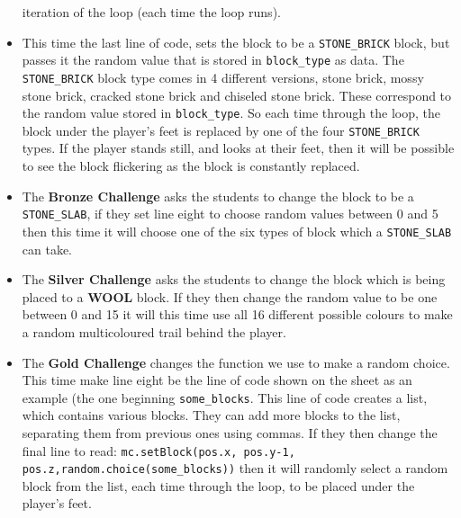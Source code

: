\documentclass{geocraft-lesson-plan}
\begin{document}
\begin{itemize}
  iteration of the loop (each time the loop runs).
\item This time the last line of code, sets the block to be a \lstinline{STONE_BRICK} block, but passes it the random value
  that is stored in \lstinline{block_type} as data. The \lstinline{STONE_BRICK} block type comes in 4 different versions,
  stone brick, mossy stone brick, cracked stone brick and chiseled stone brick. These correspond to the random value
  stored in \lstinline{block_type}. So each time through the loop, the block under the player's feet is replaced by one of
  the four \lstinline{STONE_BRICK} types. If the player stands still, and looks at their feet, then it will be possible to
  see the block flickering as the block is constantly replaced. 
\item The \textbf{Bronze Challenge} asks the students to change the block to be a \lstinline{STONE_SLAB}, if they set line
  eight to choose random values between 0 and 5 then this time it will choose one of the six types of block which a
  \lstinline{STONE_SLAB} can take.
\item The \textbf{Silver Challenge} asks the students to change the block which is being placed to a \textbf{WOOL}
  block. If they then change the random value to be one between 0 and 15 it will this time use all 16 different possible
  colours to make a random multicoloured trail behind the player.
\item The \textbf{Gold Challenge} changes the function we use to make a random choice. This time make line eight be the
  line of code shown on the sheet as an example (the one beginning \lstinline{some_blocks}. This line of code creates a
  list, which contains various blocks. They can add more blocks to the list, separating them from previous ones using
  commas. If they then change the final line to read: 
  \lstinline{mc.setBlock(pos.x, pos.y-1, pos.z,random.choice(some_blocks))} 
  then it will randomly select a random block from the list, each time through the loop, to be placed under the player's
  feet. 
\end{itemize}
\end{document}
